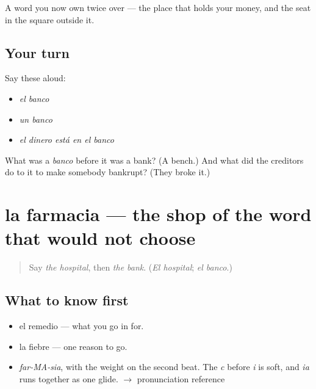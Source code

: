 \begin{grammarlens}[title={What you've built}]
A word you now own twice over — the place that holds your money, and the seat in the square outside it.
\end{grammarlens}

\subsection*{Your turn}
Say these aloud:

\begin{itemize}
\raggedright
  \item \emph{el banco}
  \item \emph{un banco}
  \item \emph{el dinero está en el banco}
\end{itemize}

\begin{tcolorbox}[breakable,colback=teal!4,colframe=teal!35!black,title={Before you move on}]
What was a \emph{banco} before it was a bank? (A bench.) And what did the creditors do to it to make somebody bankrupt? (They broke it.)
\end{tcolorbox}
\section[la farmacia]{la farmacia — the shop of the word that would not choose}

\label{lesson:ES-C353-farmacia}



\begin{quote}
Say \emph{the hospital}, then \emph{the bank}. (\emph{El hospital}; \emph{el banco}.)
\end{quote}

\subsection*{What to know first}
\begin{itemize}
\raggedright
  \item el remedio — what you go in for.
  \item la fiebre — one reason to go.
\end{itemize}

\begin{sounds}
\begin{itemize}
\raggedright
  \item \emph{far-MA-sia}, with the weight on the second beat. The \emph{c} before \emph{i} is soft, and \emph{ia} runs together as one glide. $\to$ pronunciation reference
\end{itemize}
\end{sounds}

